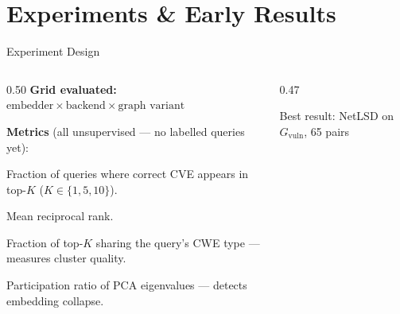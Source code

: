 \documentclass[aspectratio=169,10pt]{beamer}
\begin{document}
\section{Experiments \& Early Results}

\begin{frame}{Experiment Design}
\begin{columns}[T]
\begin{column}{0.50\textwidth}
  \textbf{Grid evaluated:}
  $\text{embedder} \times \text{backend} \times \text{graph variant}$

  \vspace{0.5em}
  \textbf{Metrics} (all unsupervised — no labelled queries yet):
  \begin{description}
    \item[\textbf{Hit@K}] Fraction of queries where correct CVE
      appears in top-$K$ ($K \in \{1,5,10\}$).
    \item[\textbf{MRR}] Mean reciprocal rank.
    \item[\textbf{CWE recall}] Fraction of top-$K$ sharing
      the query's CWE type — measures cluster quality.
    \item[\textbf{Eff. dim}] Participation ratio of PCA
      eigenvalues — detects embedding collapse.
  \end{description}

\end{column}
\begin{column}{0.47\textwidth}
  \centering

  {\scriptsize\color{gray} Best result: NetLSD on $G_{\text{vuln}}$, 65 pairs}
\end{column}
\end{columns}
\end{frame}
\end{document}
